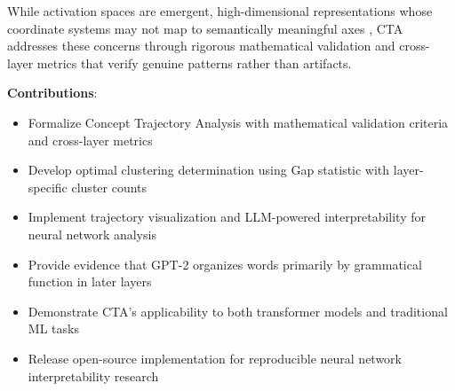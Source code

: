 While activation spaces are emergent, high-dimensional representations whose coordinate systems may not map to semantically meaningful axes \citep{ribeiro2016, lundberg2017}, CTA addresses these concerns through rigorous mathematical validation and cross-layer metrics that verify genuine patterns rather than artifacts.

\textbf{Contributions}:
\begin{itemize}
    \item Formalize Concept Trajectory Analysis with mathematical validation criteria and cross-layer metrics
    \item Develop optimal clustering determination using Gap statistic with layer-specific cluster counts
    \item Implement trajectory visualization and LLM-powered interpretability for neural network analysis
    \item Provide evidence that GPT-2 organizes words primarily by grammatical function in later layers
    \item Demonstrate CTA's applicability to both transformer models and traditional ML tasks
    \item Release open-source implementation for reproducible neural network interpretability research
\end{itemize}